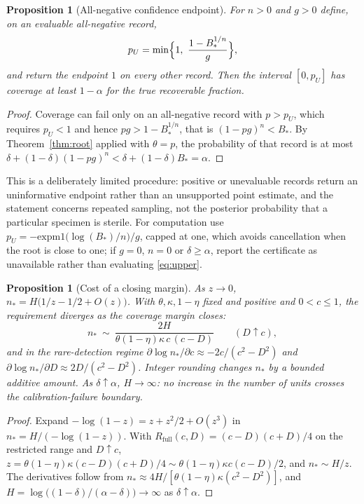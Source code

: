\documentclass[11pt]{article}
\newtheorem{proposition}[theorem]{Proposition}
\theoremstyle{definition}
\theoremstyle{remark}
\newcommand{\Rfull}{R_{\mathrm{full}}}
\begin{document}
\begin{proposition}[All-negative confidence endpoint]\label{prop:endpoint}
For $n>0$ and $g>0$ define, on an evaluable all-negative record,
\begin{equation}\label{eq:upper}
p_U=\min\Bigl\{1,\ \frac{1-B_*^{1/n}}{g}\Bigr\},
\end{equation}
and return the endpoint $1$ on every other record. Then the interval $[0,p_U]$
has coverage at least $1-\alpha$ for the true recoverable fraction.
\end{proposition}

\begin{proof}
Coverage can fail only on an all-negative record with $p>p_U$, which requires
$p_U<1$ and hence $pg>1-B_*^{1/n}$, that is $(1-pg)^n<B_*$. By
Theorem~\ref{thm:root} applied with $\theta=p$, the probability of that record is
at most $\delta+(1-\delta)(1-pg)^n<\delta+(1-\delta)B_*=\alpha$.
\end{proof}

This is a deliberately limited procedure: positive or unevaluable records return
an uninformative endpoint rather than an unsupported point estimate, and the
statement concerns repeated sampling, not the posterior probability that a
particular specimen is sterile. For computation use
$p_U=-\mathrm{expm1}\bigl(\log(B_*)/n\bigr)/g$, capped at one, which avoids
cancellation when the root is close to one; if $g=0$, $n=0$ or $\delta\ge\alpha$,
report the certificate as unavailable rather than evaluating \eqref{eq:upper}.

\begin{proposition}[Cost of a closing margin]\label{prop:asym}
As $z\to0$, $n_*=H\bigl(1/z-1/2+O(z)\bigr)$. With $\theta,\kappa,1-\eta$ fixed
and positive and $0<c\le1$, the requirement diverges as the coverage margin
closes:
\[
n_*\ \sim\ \frac{2H}{\theta(1-\eta)\kappa\,c\,(c-D)}\qquad (D\uparrow c),
\]
and in the rare-detection regime
$\partial\log n_*/\partial c\approx-2c/(c^2-D^2)$ and
$\partial\log n_*/\partial D\approx 2D/(c^2-D^2)$. Integer rounding changes $n_*$
by a bounded additive amount. As $\delta\uparrow\alpha$, $H\to\infty$: no
increase in the number of units crosses the calibration-failure boundary.
\end{proposition}

\begin{proof}
Expand $-\log(1-z)=z+z^2/2+O(z^3)$ in $n_*=H/(-\log(1-z))$. With
$\Rfull(c,D)=(c-D)(c+D)/4$ on the restricted range and $D\uparrow c$,
$z=\theta(1-\eta)\kappa(c-D)(c+D)/4\sim\theta(1-\eta)\kappa c(c-D)/2$, and
$n_*\sim H/z$. The derivatives follow from $n_*\approx4H/[\theta(1-\eta)\kappa
(c^2-D^2)]$, and $H=\log\bigl((1-\delta)/(\alpha-\delta)\bigr)\to\infty$ as
$\delta\uparrow\alpha$.
\end{proof}
\end{document}
